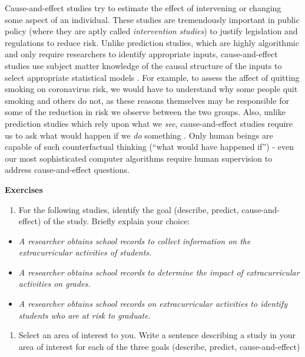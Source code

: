 \documentclass[
]{book}
\providecommand{\tightlist}{%
  \setlength{\itemsep}{0pt}\setlength{\parskip}{0pt}}
\begin{document}
Cause-and-effect studies try to estimate the effect of intervening or changing some aspect of an individual. These studies are tremendously important in public policy (where they are aptly called \emph{intervention studies}) to justify legislation and regulations to reduce risk. Unlike prediction studies, which are highly algorithmic and only require researchers to identify appropriate inputs, cause-and-effect studies use subject matter knowledge of the causal structure of the inputs to select appropriate statistical models \citep{hernan2019second}. For example, to assess the affect of quitting smoking on coronavirus risk, we would have to understand why some people quit smoking and others do not, as these reasons themselves may be responsible for some of the reduction in risk we observe between the two groups. Also, unlike prediction studies which rely upon what we \emph{see}, cause-and-effect studies require us to ask what would happen if we \emph{do} something \citep{pearl2018book}. Only human beings are capable of such counterfactual thinking (``what would have happened if'') - even our most sophisticated computer algorithms require human supervision to address cause-and-effect questions.

\textbf{Exercises}

\begin{enumerate}
\def\labelenumi{\arabic{enumi}.}
\tightlist
\item
  For the following studies, identify the goal (describe, predict, cause-and-effect) of the study. Briefly explain your choice:
\end{enumerate}

\begin{itemize}
\item
  \emph{A researcher obtains school records to collect information on the extracurricular activities of students.}
\item
  \emph{A researcher obtains school records to determine the impact of extracurricular activities on grades.}
\item
  \emph{A researcher obtains school records on extracurricular activities to identify students who are at risk to graduate.}
\end{itemize}

\begin{enumerate}
\def\labelenumi{\arabic{enumi}.}
\setcounter{enumi}{1}
\tightlist
\item
  Select an area of interest to you. Write a sentence describing a study in your area of interest for each of the three goals (describe, predict, cause-and-effect)
\end{enumerate}
\end{document}
